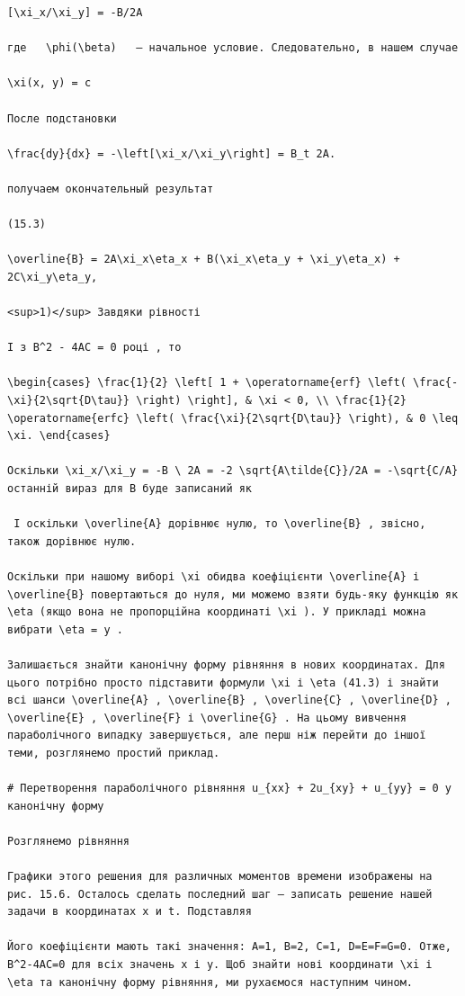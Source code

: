 \documentclass[
  ukrainian,
]{article}
\begin{document}
\begin{verbatim}
[\xi_x/\xi_y] = -B/2A

где   \phi(\beta)   — начальное условие. Следовательно, в нашем случае

\xi(x, y) = c

После подстановки

\frac{dy}{dx} = -\left[\xi_x/\xi_y\right] = B_t 2A.

получаем окончательный результат

(15.3)

\overline{B} = 2A\xi_x\eta_x + B(\xi_x\eta_y + \xi_y\eta_x) + 2C\xi_y\eta_y,

<sup>1)</sup> Завдяки рівності

І з B^2 - 4AC = 0 році , то

\begin{cases} \frac{1}{2} \left[ 1 + \operatorname{erf} \left( \frac{-\xi}{2\sqrt{D\tau}} \right) \right], & \xi < 0, \\ \frac{1}{2} \operatorname{erfc} \left( \frac{\xi}{2\sqrt{D\tau}} \right), & 0 \leq \xi. \end{cases}

Оскільки \xi_x/\xi_y = -B \ 2A = -2 \sqrt{A\tilde{C}}/2A = -\sqrt{C/A} останній вираз для B буде записаний як

 І оскільки \overline{A} дорівнює нулю, то \overline{B} , звісно, також дорівнює нулю.

Оскільки при нашому виборі \xi обидва коефіцієнти \overline{A} і \overline{B} повертаються до нуля, ми можемо взяти будь-яку функцію як \eta (якщо вона не пропорційна координаті \xi ). У прикладі можна вибрати \eta = y .

Залишається знайти канонічну форму рівняння в нових координатах. Для цього потрібно просто підставити формули \xi і \eta (41.3) і знайти всі шанси \overline{A} , \overline{B} , \overline{C} , \overline{D} , \overline{E} , \overline{F} і \overline{G} . На цьому вивчення параболічного випадку завершується, але перш ніж перейти до іншої теми, розглянемо простий приклад.

# Перетворення параболічного рівняння u_{xx} + 2u_{xy} + u_{yy} = 0 у канонічну форму

Розглянемо рівняння

Графики этого решения для различных моментов времени изображены на рис. 15.6. Осталось сделать последний шаг — записать решение нашей задачи в координатах x и t. Подставляя

Його коефіцієнти мають такі значення: A=1, B=2, C=1, D=E=F=G=0. Отже, B^2-4AC=0 для всіх значень x і y. Щоб знайти нові координати \xi і \eta та канонічну форму рівняння, ми рухаємося наступним чином.


\end{verbatim}
\end{document}
